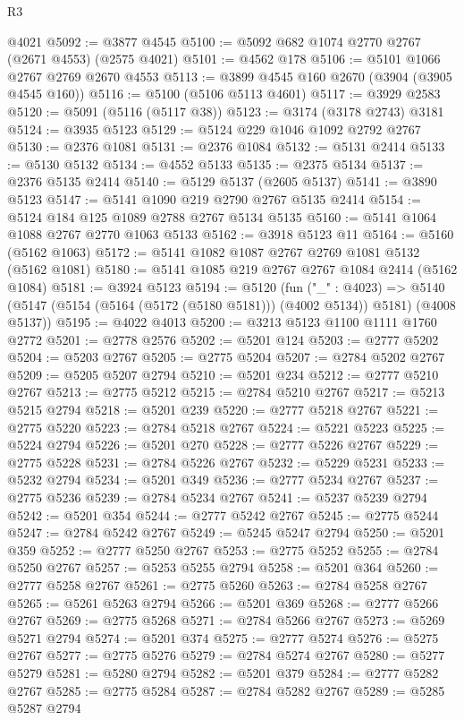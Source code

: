 \begin{lexlean}{R3}
\begin{coremodule}
    @4021
@5092 := @3877 @4545
@5100 := @5092 @682 @1074 @2770 @2767 (@2671 @4553) (@2575 @4021)
@5101 := @4562 @178
@5106 := @5101 @1066 @2767 @2769 @2670 @4553
@5113 := @3899 @4545 @160 @2670 (@3904 (@3905 @4545 @160))
@5116 := @5100 (@5106 @5113 @4601)
@5117 := @3929 @2583
@5120 := @5091 (@5116 (@5117 @38))
@5123 := @3174 (@3178 @2743) @3181
@5124 := @3935 @5123
@5129 := @5124 @229 @1046 @1092 @2792 @2767
@5130 := @2376 @1081
@5131 := @2376 @1084
@5132 := @5131 @2414
@5133 := @5130 @5132
@5134 := @4552 @5133
@5135 := @2375 @5134
@5137 := @2376 @5135 @2414
@5140 := @5129 @5137 (@2605 @5137)
@5141 := @3890 @5123
@5147 := @5141 @1090 @219 @2790 @2767 @5135 @2414
@5154 := @5124 @184 @125 @1089 @2788 @2767 @5134 @5135
@5160 := @5141 @1064 @1088 @2767 @2770 @1063 @5133
@5162 := @3918 @5123 @11
@5164 := @5160 (@5162 @1063)
@5172 := @5141 @1082 @1087 @2767 @2769 @1081 @5132 (@5162 @1081)
@5180 := @5141 @1085 @219 @2767 @2767 @1084 @2414 (@5162 @1084)
@5181 := @3924 @5123
@5194 := @5120
    (fun ("_" : @4023) =>
    @5140 (@5147 (@5154 (@5164 (@5172 (@5180 @5181))) (@4002 @5134)) @5181) (@4008 @5137))
@5195 := @4022 @4013
@5200 := @3213 @5123 @1100 @1111 @1760 @2772
@5201 := @2778 @2576
@5202 := @5201 @124
@5203 := @2777 @5202
@5204 := @5203 @2767
@5205 := @2775 @5204
@5207 := @2784 @5202 @2767
@5209 := @5205 @5207 @2794
@5210 := @5201 @234
@5212 := @2777 @5210 @2767
@5213 := @2775 @5212
@5215 := @2784 @5210 @2767
@5217 := @5213 @5215 @2794
@5218 := @5201 @239
@5220 := @2777 @5218 @2767
@5221 := @2775 @5220
@5223 := @2784 @5218 @2767
@5224 := @5221 @5223
@5225 := @5224 @2794
@5226 := @5201 @270
@5228 := @2777 @5226 @2767
@5229 := @2775 @5228
@5231 := @2784 @5226 @2767
@5232 := @5229 @5231
@5233 := @5232 @2794
@5234 := @5201 @349
@5236 := @2777 @5234 @2767
@5237 := @2775 @5236
@5239 := @2784 @5234 @2767
@5241 := @5237 @5239 @2794
@5242 := @5201 @354
@5244 := @2777 @5242 @2767
@5245 := @2775 @5244
@5247 := @2784 @5242 @2767
@5249 := @5245 @5247 @2794
@5250 := @5201 @359
@5252 := @2777 @5250 @2767
@5253 := @2775 @5252
@5255 := @2784 @5250 @2767
@5257 := @5253 @5255 @2794
@5258 := @5201 @364
@5260 := @2777 @5258 @2767
@5261 := @2775 @5260
@5263 := @2784 @5258 @2767
@5265 := @5261 @5263 @2794
@5266 := @5201 @369
@5268 := @2777 @5266 @2767
@5269 := @2775 @5268
@5271 := @2784 @5266 @2767
@5273 := @5269 @5271 @2794
@5274 := @5201 @374
@5275 := @2777 @5274
@5276 := @5275 @2767
@5277 := @2775 @5276
@5279 := @2784 @5274 @2767
@5280 := @5277 @5279
@5281 := @5280 @2794
@5282 := @5201 @379
@5284 := @2777 @5282 @2767
@5285 := @2775 @5284
@5287 := @2784 @5282 @2767
@5289 := @5285 @5287 @2794

\end{coremodule}
\end{lexlean}
